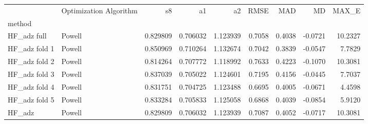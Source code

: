 \begin{tabular}{llrrrrrrr}
 & Optimization Algorithm & s8 & a1 & a2 & RMSE & MAD & MD & MAX_E \\
method &  &  &  &  &  &  &  &  \\
HF_adz full & Powell & 0.829809 & 0.706032 & 1.123939 & 0.7058 & 0.4038 & -0.0721 & 10.2327 \\
HF_adz fold 1 & Powell & 0.850969 & 0.710264 & 1.132674 & 0.7042 & 0.3839 & -0.0547 & 7.7829 \\
HF_adz fold 2 & Powell & 0.814264 & 0.707772 & 1.118992 & 0.7633 & 0.4223 & -0.1070 & 10.3081 \\
HF_adz fold 3 & Powell & 0.837039 & 0.705022 & 1.124601 & 0.7195 & 0.4156 & -0.0445 & 7.7037 \\
HF_adz fold 4 & Powell & 0.831751 & 0.704725 & 1.123488 & 0.6695 & 0.4005 & -0.0671 & 4.4598 \\
HF_adz fold 5 & Powell & 0.833284 & 0.705833 & 1.125058 & 0.6868 & 0.4039 & -0.0854 & 5.9120 \\
HF_adz & Powell & 0.829809 & 0.706032 & 1.123939 & 0.7087 & 0.4052 & -0.0717 & 10.3081 \\
\end{tabular}
